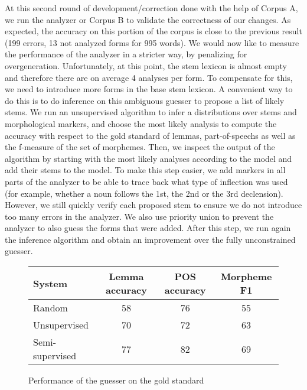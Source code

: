\documentclass[11pt,letterpaper]{article}
\begin{document}
At this second round of development/correction done with the help of Corpus A, we run the analyzer or Corpus B to validate the correctness of our changes. As expected, the accuracy on this portion of the corpus is close to the previous result (199 errors, 13 not analyzed forms for 995 words). We would now like to measure the performance of the analyzer in a stricter way, by penalizing for overgeneration. Unfortunately, at this point, the stem lexicon is almost empty and therefore there are on average 4 analyses per form. To compensate for this, we need to introduce more forms in the base stem lexicon. A convenient way to do this is to do inference on this ambiguous guesser to propose a list of likely stems. We run an unsupervised algorithm \cite{morpholm} to infer a distributions over stems and morphological markers, and choose the most likely analysis to compute the accuracy with respect to the gold standard of lemmas, part-of-speechs as well as the f-measure of the set of morphemes. Then, we inspect the output of the algorithm by starting with the most likely analyses according to the model and add their stems to the model. To make this step easier, we add markers in all parts of the analyzer to be able to trace back what type of inflection was used (for example, whether a noun follows the 1st, the 2nd or the 3rd declension). However, we still quickly verify each proposed stem to ensure we do not introduce too many errors in the analyzer. We also use priority union to prevent the analyzer to also guess the forms that were added. After this step, we run again the inference algorithm and obtain an improvement over the fully unconstrained guesser.

\begin{figure}
\begin{center}
    \begin{tabular}{|l | c | c | c|}
        \hline
        System & Lemma accuracy & POS accuracy & Morpheme F1\\
        \hline
        Random & 58 & 76 & 55 \\ \hline
  Unsupervised & 70 & 72 & 63 \\ \hline
        Semi-supervised & 77 & 82 & 69 \\
        \hline
    \end{tabular}
\end{center}
\caption{Performance of the guesser on the gold standard}
\end{figure}
\end{document}
